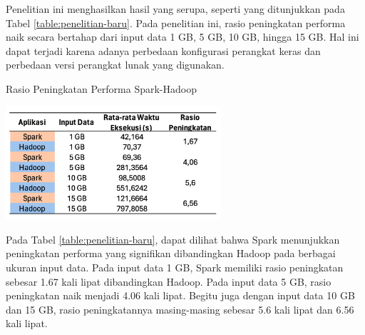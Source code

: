 Penelitian ini menghasilkan hasil yang serupa, seperti yang ditunjukkan pada Tabel \ref{table:penelitian-baru}. Pada penelitian ini, rasio peningkatan performa naik secara bertahap dari input data 1 GB, 5 GB, 10 GB, hingga 15 GB. Hal ini dapat terjadi karena adanya perbedaan konfigurasi perangkat keras dan perbedaan versi perangkat lunak yang digunakan.

\begin{table}[h]
  \centering
  \caption{Rasio Peningkatan Performa Spark-Hadoop}
  \includegraphics[width=0.6\textwidth]{figures/ch04/0-penelitian-baru}
  \label{table:penelitian-baru}
\end{table}

Pada Tabel \ref{table:penelitian-baru}, dapat dilihat bahwa Spark menunjukkan peningkatan performa yang signifikan dibandingkan Hadoop pada berbagai ukuran input data. Pada input data 1 GB, Spark memiliki rasio peningkatan sebesar 1.67 kali lipat dibandingkan Hadoop. Pada input data 5 GB, rasio peningkatan naik menjadi 4.06 kali lipat. Begitu juga dengan input data 10 GB dan 15 GB, rasio peningkatannya masing-masing sebesar 5.6 kali lipat dan 6.56 kali lipat.



